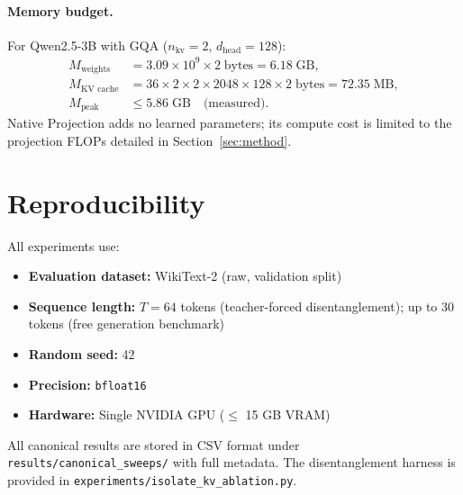 \documentclass{article}
\begin{document}
\paragraph{Memory budget.}
For Qwen2.5-3B with GQA ($n_{\text{kv}} = 2$, $d_{\text{head}} = 128$):
\begin{align}
    M_{\text{weights}} &= 3.09 \times 10^9 \times 2\;\text{bytes} = 6.18\;\text{GB}, \\
    M_{\text{KV cache}} &= 36 \times 2 \times 2 \times 2048 \times 128 \times 2\;\text{bytes} = 72.35\;\text{MB}, \\
    M_{\text{peak}} &\le 5.86\;\text{GB} \quad \text{(measured)}.
\end{align}
Native Projection adds no learned parameters; its compute cost is limited to the projection FLOPs detailed in Section~\ref{sec:method}.

\section{Reproducibility}
\label{app:reproducibility}

All experiments use:
\begin{itemize}[nosep,leftmargin=*]
    \item \textbf{Evaluation dataset:} WikiText-2 (raw, validation split)
    \item \textbf{Sequence length:} $T = 64$ tokens (teacher-forced disentanglement); up to 30 tokens (free generation benchmark)
    \item \textbf{Random seed:} 42
    \item \textbf{Precision:} \texttt{bfloat16}
    \item \textbf{Hardware:} Single NVIDIA GPU ($\le$ 15 GB VRAM)
\end{itemize}

All canonical results are stored in CSV format under \texttt{results/canonical\_sweeps/} with full metadata. The disentanglement harness is provided in \texttt{experiments/isolate\_kv\_ablation.py}.
\end{document}
